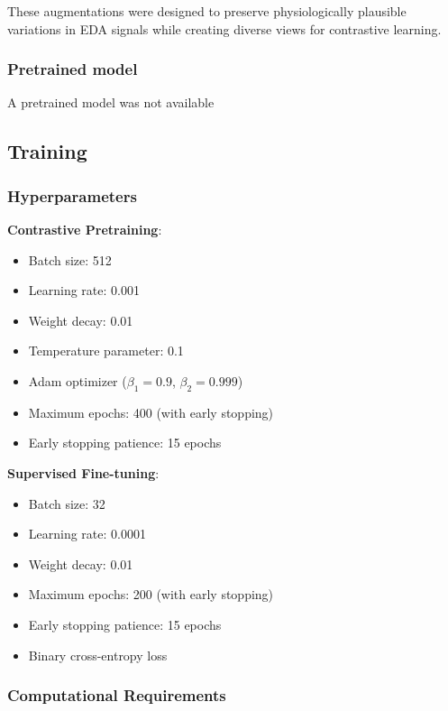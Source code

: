 \documentclass[10pt,letterpaper,twocolumn]{article}
\begin{document}
These augmentations were designed to preserve physiologically plausible variations in EDA signals while creating diverse views for contrastive learning.

\subsubsection{Pretrained model}

A pretrained model was not available

\subsection{Training}

\subsubsection{Hyperparameters}

\textbf{Contrastive Pretraining}:
\begin{itemize}
    \item Batch size: 512
    \item Learning rate: 0.001
    \item Weight decay: 0.01
    \item Temperature parameter: 0.1
    \item Adam optimizer ($\beta_1=0.9$, $\beta_2=0.999$)
    \item Maximum epochs: 400 (with early stopping)
    \item Early stopping patience: 15 epochs
\end{itemize}

\textbf{Supervised Fine-tuning}:
\begin{itemize}
    \item Batch size: 32
    \item Learning rate: 0.0001
    \item Weight decay: 0.01
    \item Maximum epochs: 200 (with early stopping)
    \item Early stopping patience: 15 epochs
    \item Binary cross-entropy loss
\end{itemize}

\subsubsection{Computational Requirements}
\end{document}

